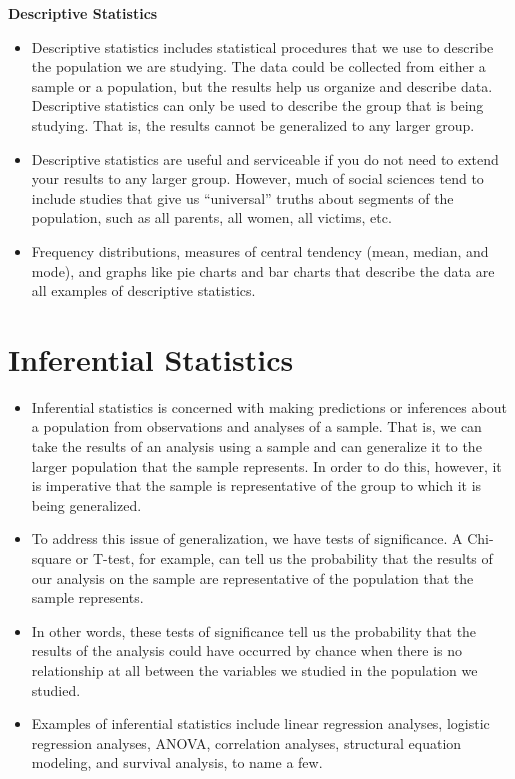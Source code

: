 \documentclass[]{report}
\begin{document}
\noindent \textbf{Descriptive Statistics}
\begin{itemize}
	\item Descriptive statistics includes statistical procedures that we use to describe the population we are studying. The data could be collected from either a sample or a population, but the results help us organize and describe data. Descriptive statistics can only be used to describe the group that is being studying. That is, the results cannot be generalized to any larger group.
	
	\item 	Descriptive statistics are useful and serviceable if you do not need to extend your results to any larger group. However, much of social sciences tend to include studies that give us “universal” truths about segments of the population, such as all parents, all women, all victims, etc.
	
	\item Frequency distributions, measures of central tendency (mean, median, and mode), and graphs like pie charts and bar charts that describe the data are all examples of descriptive statistics.
	
\end{itemize}

\section{Inferential Statistics}
\begin{itemize}
	\item Inferential statistics is concerned with making predictions or inferences about a population from observations and analyses of a sample. That is, we can take the results of an analysis using a sample and can generalize it to the larger population that the sample represents. In order to do this, however, it is imperative that the sample is representative of the group to which it is being generalized.
	
	\item To address this issue of generalization, we have tests of significance. A Chi-square or T-test, for example, can tell us the probability that the results of our analysis on the sample are representative of the population that the sample represents. 
	
	\item In other words, these tests of significance tell us the probability that the results of the analysis could have occurred by chance when there is no relationship at all between the variables we studied in the population we studied.
	
	\item Examples of inferential statistics include linear regression analyses, logistic regression analyses, ANOVA, correlation analyses, structural equation modeling, and survival analysis, to name a few.
	
\end{itemize}
\end{document}
